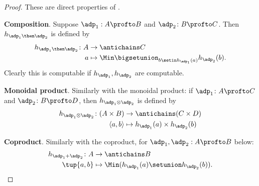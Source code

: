 \begin{proof}
    These are direct properties of \DP.


    \textbf{Composition}.
    Suppose $\adp_1 : A \profto B$ and $\adp_2 \colon B \profto C$.
    Then $h_{\adp_1\then \adp_2} $ is defined by
    \begin{equation}
        \begin{aligned}
            h_{\adp_1 \then \adp_2} \colon A & \to \antichains C \\
            a                                & \mapsto \Min \bigsetunion_{b \setin h_{\adp_1}(a)} h_{\adp_2}(b).
        \end{aligned}
    \end{equation}
    Clearly this is computable if $h_{\adp_1}, h_{\adp_2}$ are computable.


    \textbf{Monoidal product}.
    Similarly with the monoidal product: if $\adp_1 \colon A \profto C$ and $\adp_2 \colon B \profto D$, then $h_{\adp_1 \otimes \adp_2}$ is defined by
    \begin{equation}
        \begin{aligned}
            h_{\adp_1 \otimes \adp_2} \colon (A \times B) & \to \antichains (C \times D) \\
            \langle a, b \rangle                          & \mapsto h_{\adp_1}(a) \times h_{\adp_2}(b)
        \end{aligned}
    \end{equation}

    \textbf{Coproduct}.
    Similarly with the coproduct, for $\adp_1, \adp_2 : A \profto B$ below:
    \begin{equation}
        \begin{aligned}
            h_{\adp_1 + \adp_2} \colon  A & \to \antichains B \\
            \tup{a,b}                     & \mapsto \Min (h_{\adp_1}(a) \setunion h_{\adp_2}(b)).
        \end{aligned}
    \end{equation}

\end{proof}

